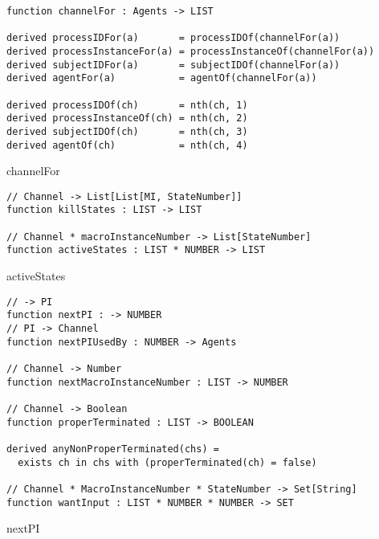 \begin{listing}[H]
\begin{verbatim}
function channelFor : Agents -> LIST

derived processIDFor(a)       = processIDOf(channelFor(a))
derived processInstanceFor(a) = processInstanceOf(channelFor(a))
derived subjectIDFor(a)       = subjectIDOf(channelFor(a))
derived agentFor(a)           = agentOf(channelFor(a))

derived processIDOf(ch)       = nth(ch, 1)
derived processInstanceOf(ch) = nth(ch, 2)
derived subjectIDOf(ch)       = nth(ch, 3)
derived agentOf(ch)           = nth(ch, 4)
\end{verbatim}
\caption{channelFor}
\label{lst:asm:channelFor}
\end{listing}


\begin{listing}[H]
\begin{verbatim}
// Channel -> List[List[MI, StateNumber]]
function killStates : LIST -> LIST

// Channel * macroInstanceNumber -> List[StateNumber]
function activeStates : LIST * NUMBER -> LIST
\end{verbatim}
\caption{activeStates}
\label{lst:asm:activeStates}
\end{listing}


\begin{listing}[H]
\begin{verbatim}
// -> PI
function nextPI : -> NUMBER
// PI -> Channel
function nextPIUsedBy : NUMBER -> Agents

// Channel -> Number
function nextMacroInstanceNumber : LIST -> NUMBER

// Channel -> Boolean
function properTerminated : LIST -> BOOLEAN

derived anyNonProperTerminated(chs) =
  exists ch in chs with (properTerminated(ch) = false)

// Channel * MacroInstanceNumber * StateNumber -> Set[String]
function wantInput : LIST * NUMBER * NUMBER -> SET
\end{verbatim}
\caption{nextPI}
\label{lst:asm:nextPI}
\end{listing}



